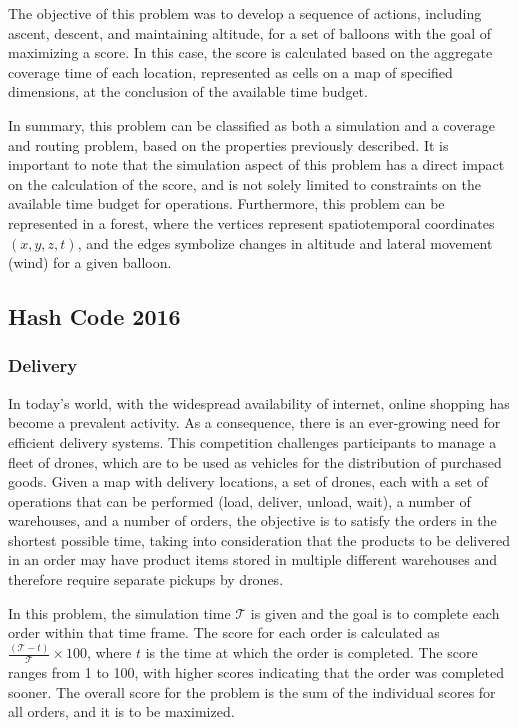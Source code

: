 The objective of this problem was to develop a sequence of actions, including
ascent, descent, and maintaining altitude, for a set of balloons with the goal
of maximizing a score. In this case, the score is calculated based on the
aggregate coverage time of each location, represented as cells on a map of
specified dimensions, at the conclusion of the available time budget.

In summary, this problem can be classified as both a simulation and a coverage
and routing problem, based on the properties previously described. It is
important to note that the simulation aspect of this problem has a direct impact
on the calculation of the score, and is not solely limited to constraints on the
available time budget for operations. Furthermore, this problem can be
represented in a forest, where the vertices represent spatiotemporal coordinates
$(x, y, z, t)$, and the edges symbolize changes in altitude and lateral movement
(wind) for a given balloon.

\subsection{Hash Code 2016}
\label{subsec:hashcode-2016}

\subsubsection*{Delivery}
\label{subsubsec:hashcode-2016-qualification}

In today's world, with the widespread availability of internet, online shopping
has become a prevalent activity. As a consequence, there is an ever-growing need
for efficient delivery systems. This competition challenges participants to
manage a fleet of drones, which are to be used as vehicles for the distribution
of purchased goods. Given a map with delivery locations, a set of drones, each
with a set of operations that can be performed (load, deliver, unload, wait), a
number of warehouses, and a number of orders, the objective is to satisfy the
orders in the shortest possible time, taking into consideration that the
products to be delivered in an order may have product items stored in multiple
different warehouses and therefore require separate pickups by drones.

In this problem, the simulation time $\mathcal{T}$ is given and the goal is to
complete each order within that time frame. The score for each order is
calculated as $\frac{(\mathcal{T} - t)}{\mathcal{T}} \times 100$, where $t$ is
the time at which the order is completed. The score ranges from 1 to 100, with
higher scores indicating that the order was completed sooner. The overall score
for the problem is the sum of the individual scores for all orders, and it is to
be maximized.

